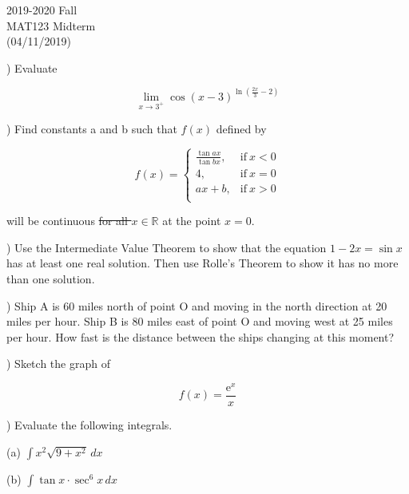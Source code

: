 \documentclass{article}
\begin{document}
\large

\begin{center}
2019-2020 Fall\\MAT123 Midterm\\(04/11/2019)
\end{center}

) Evaluate

\begin{equation*}\lim_{x\to3^+}\cos(x-3)^{\ln\left(\frac{2x}{3}-2\right)}\end{equation*}

\hfill

) Find constants a and b such that $f(x)$ defined by

\[
f(x) =
\begin{cases}
\displaystyle \frac{\tan ax}{\tan bx}, & \text{if}\ x < 0 \\
4, & \text{if}\ x = 0 \\
ax+b, & \text{if}\ x >0 \\
\end{cases}
\]

\hfill

\noindent will be continuous \sout{for all $x \in \mathbb{R}$} at the point $x=0$.

\hfill

) Use the Intermediate Value Theorem to show that the equation $1-2x =\sin x$ has at least one real solution. Then use Rolle's Theorem to show it has no more than one solution.

\hfill

) Ship A is 60 miles north of point O and moving in the north direction at 20 miles per hour. Ship B is 80 miles east of point O and moving west at 25 miles per hour. How fast is the distance between the ships changing at this moment?

\hfill

) Sketch the graph of

\begin{equation*} 
f(x) = \frac{\mathrm{e}^x}{x}
\end{equation*}

\hfill

) Evaluate the following integrals.

\noindent (a) $\displaystyle \int x^2\sqrt{9 + x^2}\, dx$

\hfill

\noindent (b) $\displaystyle \int\tan x \cdot\sec^6 x\, dx$
\end{document}
